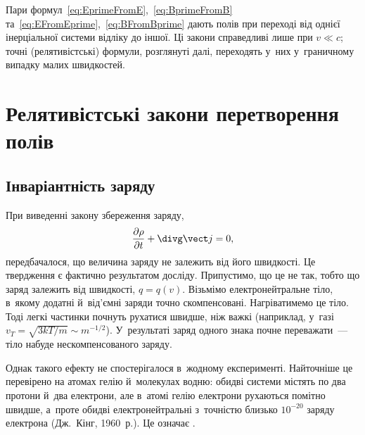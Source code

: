 \begin{Attention}
	Пари формул~\eqref{eq:EprimeFromE},~\eqref{eq:BprimeFromB}
	та~\eqref{eq:EFromEprime},~\eqref{eq:BFromBprime} дають  полів при переході від однієї інерціальної системи відліку до іншої. Ці
	закони справедливі лише при $v \ll c$; точні (релятивістські) формули, розглянуті
	далі, переходять у~них у~граничному випадку малих швидкостей.
\end{Attention}

\section{Релятивістські закони перетворення полів}\hypertarget{relativistic-field-transformation}{}

\subsection*{Інваріантність заряду}

При виведенні закону збереження заряду,
\begin{equation*}
	\frac{\partial\rho}{\partial t} + \divg\vect j = 0,
\end{equation*}
передбачалося, що величина заряду не залежить від його швидкості. Це твердження є фактично
результатом досліду. Припустимо, що це не так, тобто що заряд залежить від швидкості, $q =
q(v)$. Візьмімо електронейтральне тіло, в~якому додатні й~від'ємні заряди точно
скомпенсовані. Нагріватимемо це тіло. Тоді легкі частинки почнуть рухатися швидше, ніж
важкі (наприклад, у~газі $v_T = \sqrt{3kT/m} \sim m^{-1/2}$). У~результаті заряд одного
знака почне переважати~--- тіло набуде нескомпенсованого заряду.

Однак такого ефекту не спостерігалося в~жодному експерименті. Найточніше це перевірено на атомах гелію й~молекулах водню:
обидві системи містять по два протони й~два електрони, але в~атомі гелію електрони рухаються помітно швидше, а~проте обидві
електронейтральні з~точністю близько $10^{-20}$ заряду електрона (Дж.~Кінг, 1960~р.). Це означає
.

